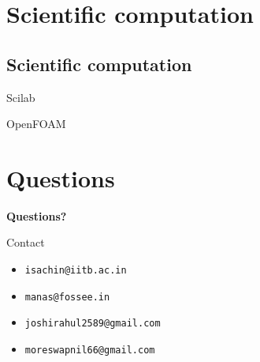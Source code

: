 \documentclass{beamer}
\begin{document}
\section{Scientific computation}
\subsection{Scientific computation}
\begin{frame}{Scilab}
  \begin{block}{}
  \end{block}
\end{frame}
\begin{frame}{OpenFOAM}
  \begin{block}{}
  \end{block}
\end{frame}

\section{Questions}
\begin{frame}{}
  \centerline{\bf Questions?}
\end{frame}
\begin{frame}{Contact}
  \begin{itemize}
  \item {\tt isachin@iitb.ac.in}
  \item {\tt manas@fossee.in}
  \item {\tt joshirahul2589@gmail.com}
  \item {\tt moreswapnil66@gmail.com}
  \end{itemize}
\end{frame}
\end{document}
